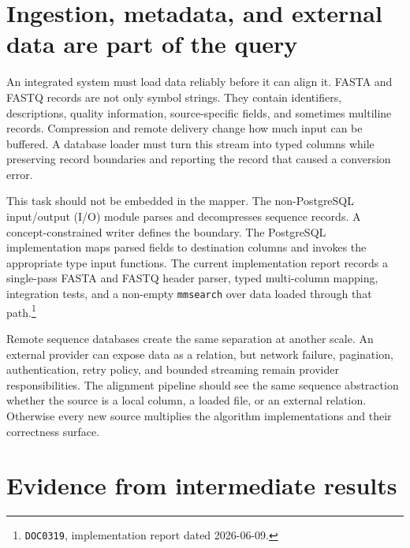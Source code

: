 \section{Ingestion, metadata, and external data are part of the query}
\label{sec:ingestion-gap}

An integrated system must load data reliably before it can align it.
FASTA and FASTQ records are not only symbol strings.  They contain
identifiers, descriptions, quality information, source-specific fields,
and sometimes multiline records.  Compression and remote delivery change
how much input can be buffered.  A database loader must turn this stream
into typed columns while preserving record boundaries and reporting the
record that caused a conversion error.

This task should not be embedded in the mapper.  The non-PostgreSQL
input/output (I/O)
module parses and decompresses sequence records.  A concept-constrained
writer defines the boundary.  The PostgreSQL implementation maps parsed
fields to destination columns and invokes the appropriate type input
functions.  The current implementation report records a single-pass
FASTA and FASTQ header parser, typed multi-column mapping, integration
tests, and a non-empty \texttt{mmsearch} over data loaded through that
path.\footnote{\texttt{DOC0319}, implementation report dated
2026-06-09.}

Remote sequence databases create the same separation at another scale.
An external provider can expose data as a relation, but network failure,
pagination, authentication, retry policy, and bounded streaming remain
provider responsibilities.  The alignment pipeline should see the same
sequence abstraction whether the source is a local column, a loaded file,
or an external relation.  Otherwise every new source multiplies the
algorithm implementations and their correctness surface.

\section{Evidence from intermediate results}
\label{sec:solution-gap-evidence}

